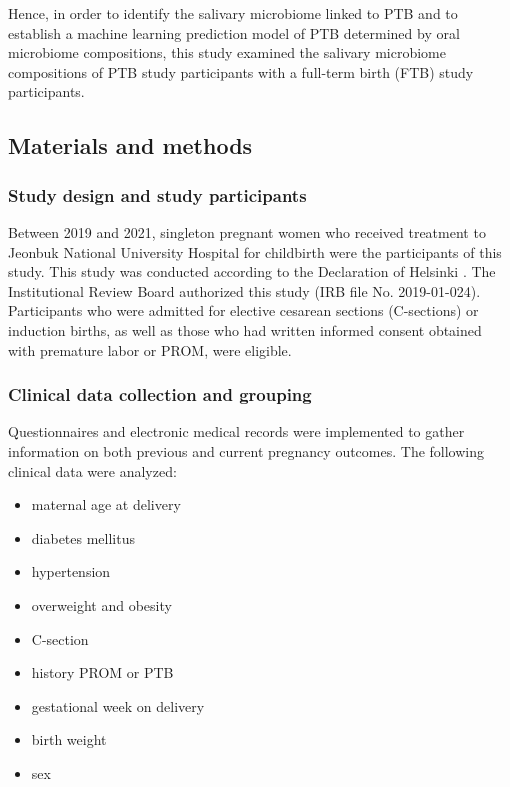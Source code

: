 \documentclass[11pt, a4paper, onecolumn, oneside]{report}
\begin{document}
            Hence, in order to identify the salivary microbiome linked to PTB and to establish a machine learning prediction model of PTB determined by oral microbiome compositions, this study examined the salivary microbiome compositions of PTB study participants with a full-term birth (FTB) study participants.
        \newpage

        \subsection{Materials and methods}
            \subsubsection{Study design and study participants}
                Between 2019 and 2021, singleton pregnant women who received treatment to Jeonbuk National University Hospital for childbirth were the participants of this study. This study was conducted according to the Declaration of Helsinki \cite{Helsinki-1}. The Institutional Review Board authorized this study (IRB file No. 2019-01-024). Participants who were admitted for elective cesarean sections (C-sections) or induction births, as well as those who had written informed consent obtained with premature labor or PROM, were eligible.

            \subsubsection{Clinical data collection and grouping}
                Questionnaires and electronic medical records were implemented to gather information on both previous and current pregnancy outcomes. The following clinical data were analyzed:
                \begin{itemize}
                    \item maternal age at delivery
                    \item diabetes mellitus
                    \item hypertension
                    \item overweight and obesity
                    \item C-section
                    \item history PROM or PTB
                    \item gestational week on delivery
                    \item birth weight
                    \item sex
                \end{itemize}
\end{document}
